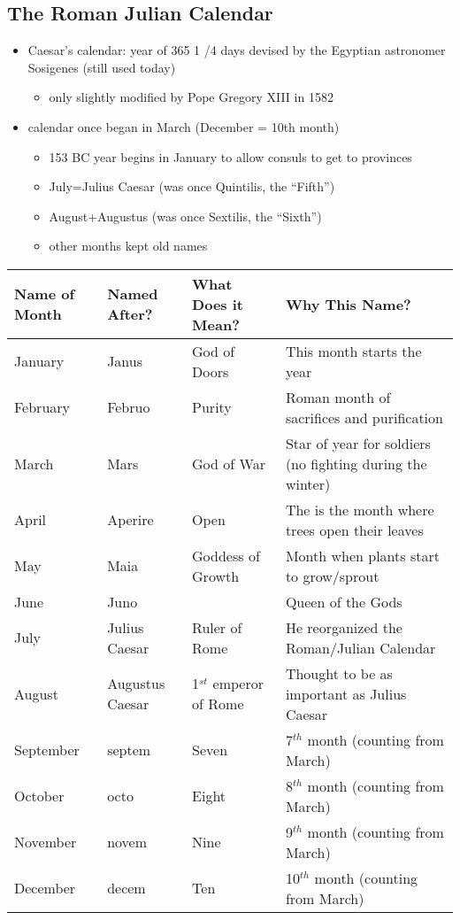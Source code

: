 \documentclass[12pt, twoside]{article}
\begin{document}
\subsection{The Roman Julian Calendar}
\begin{itemize}
\item Caesar's calendar: year of 365 1 /4 days devised by the Egyptian astronomer Sosigenes (still used today)
	\begin{itemize}
	\item only slightly modified by Pope Gregory XIII in 1582
	\end{itemize}
\item calendar once began in March (December = 10th month)
	\begin{itemize}
	\item 153 BC year begins in January to allow consuls to get to provinces
	\item July=Julius Caesar (was once Quintilis, the “Fifth”)
	\item August+Augustus (was once Sextilis, the “Sixth”)
	\item other months kept old names
	\end{itemize}
\end{itemize}
\begin{tabular}{ | l | l | l | p{4cm} | }
  \hline                       
  \textbf{Name of Month} & \textbf{Named After?} & \textbf{What Does it Mean?} & \textbf{Why This Name?} \\
  \hline
  January & Janus & God of Doors & This month starts the year \\
  \hline
  February & Februo & Purity & Roman month of sacrifices and purification \\
  \hline
  March & Mars & God of War & Star of year for soldiers (no fighting during the winter) \\
  \hline
  April & Aperire & Open & The is the month where trees open their leaves \\
  \hline
  May & Maia & Goddess of Growth & Month when plants start to grow/sprout \\
  \hline
  June & Juno & 	& Queen of the Gods \\
  \hline
  July & Julius Caesar & Ruler of Rome & He reorganized the Roman/Julian Calendar \\
  \hline
  August & Augustus Caesar & 1$^{st}$ emperor of Rome & Thought to be as important as Julius Caesar \\
  \hline
  September & septem & Seven & 7$^{th}$ month (counting from March) \\
  \hline
  October & octo & Eight & 8$^{th}$ month (counting from March) \\
  \hline
  November & novem & Nine & 9$^{th}$ month (counting from March) \\
  \hline
  December & decem & Ten & 10$^{th}$ month (counting from March) \\
  \hline
\end{tabular}
\end{document}
